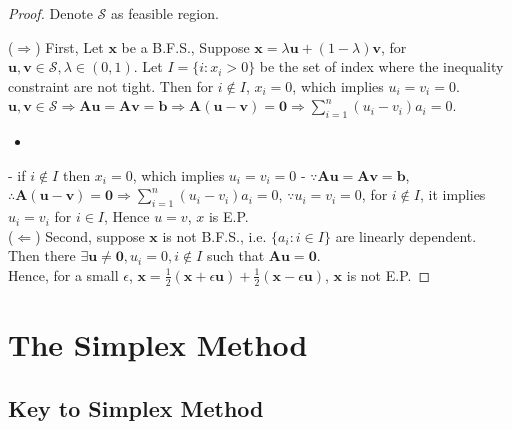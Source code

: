				\begin{proof}
					Denote $\mathcal{S}$ as feasible region. 

					($\Rightarrow$) First, Let $\mathbf{x}$ be a B.F.S., Suppose $\mathbf{x} =\lambda \mathbf{u} + (1 - \lambda) \mathbf{v}$, for $\mathbf{u}, \mathbf{v} \in \mathcal{S}, \lambda \in (0, 1)$. Let $I = \{i: x_i > 0\}$ be the set of index where the inequality constraint are not tight. Then for $i \notin I$, $x_i = 0$, which implies $u_i = v_i = 0$. $\mathbf{u}, \mathbf{v} \in \mathcal{S} \Rightarrow \mathbf{Au} = \mathbf{Av} = \mathbf{b} \Rightarrow \mathbf{A (u - v)} = \mathbf{0} \Rightarrow \sum_{i = 1}^n (u_i - v_i)a_i = 0$.
					\begin{itemize}
						\item 
					\end{itemize}
					- if $i \notin I$ then $x_i = 0$, which implies $u_i = v_i = 0$
					- $\because \mathbf{Au} = \mathbf{Av} = \mathbf{b}$, $\therefore \mathbf{A(u-v)} = \textbf{0} \Rightarrow \sum_{i=1}^n(u_i - v_i)a_i = 0$, $\because u_i = v_i = 0$, for $i\notin I$, it implies $u_i = v_i$ for $i\in I$, Hence $u=v$, $x$ is E.P.\\

					($\Leftarrow$) Second, suppose $\mathbf{x}$ is not B.F.S., i.e. $\{a_i: i \in I\}$ are linearly dependent.\\
					Then there $\exists \mathbf{u}\ne \mathbf{0}, u_i =0 , i\notin I$ such that $\mathbf{Au}=\mathbf{0}$.\\
					Hence, for a small $\epsilon$, $\mathbf{x}=\frac12(\mathbf{x} + \epsilon \mathbf{u}) + \frac12(\mathbf{x} - \epsilon \mathbf{u})$, $\mathbf{x}$ is not E.P.
				\end{proof}

			\section{The Simplex Method}
				\subsection{Key to Simplex Method}
